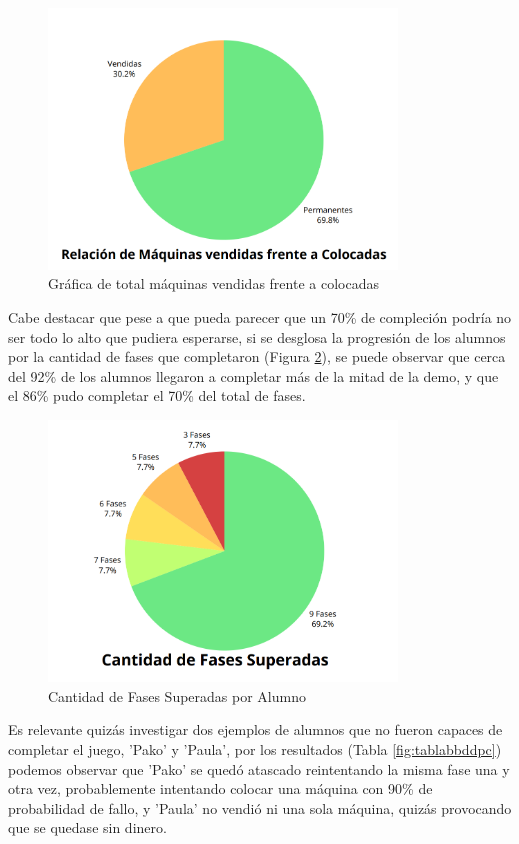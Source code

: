   \begin{figure}[H]
    \centering
      \includegraphics[width=350px,clip=true]{maquinasvendidas.png}
    \caption{Gráfica de total máquinas vendidas frente a colocadas}
    \label{fig:maquinasvendidas}
  \end{figure}
  
  Cabe destacar que pese a que pueda parecer que un 70\% de compleción podría no ser todo lo alto que pudiera esperarse, si se desglosa la progresión de los alumnos por la cantidad de fases que completaron (Figura \ref{fig:fasescompl}), 
  se puede observar que cerca del 92\% de los alumnos llegaron a completar más de la mitad de la demo, y que el 86\% pudo completar el 70\% del total de fases.

    \begin{figure}[H]
      \centering
        \includegraphics[width=350px,clip=true]{superadasporalumno.png}
      \caption{Cantidad de Fases Superadas por Alumno}
      \label{fig:fasescompl}
    \end{figure}

Es relevante quizás investigar dos ejemplos de alumnos que no fueron capaces de completar el juego, 'Pako' y 'Paula', por los resultados (Tabla \ref{fig:tablabbddpc}) podemos
 observar que 'Pako' se quedó atascado reintentando la misma fase una y otra vez, probablemente intentando colocar una máquina con 90\% de probabilidad
  de fallo, y 'Paula' no vendió ni una sola máquina, quizás provocando que se quedase sin dinero.

